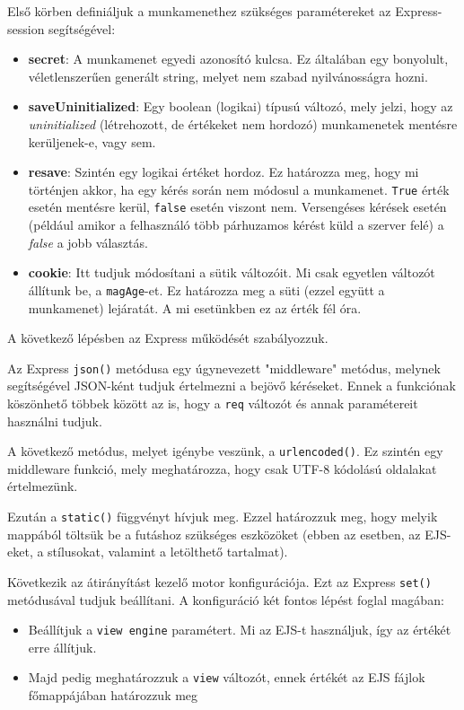 Első körben definiáljuk a munkamenethez szükséges paramétereket az Express-session segítségével:
\begin{itemize}
\item{\textbf{secret}: A munkamenet egyedi azonosító kulcsa. Ez általában egy bonyolult, véletlenszerűen generált string, melyet nem szabad nyilvánosságra hozni.}
\item{\textbf{saveUninitialized}: Egy boolean (logikai) típusú változó, mely jelzi, hogy az \textit{uninitialized} (létrehozott, de értékeket nem hordozó) munkamenetek mentésre kerüljenek-e, vagy sem.}
\item{\textbf{resave}: Szintén egy logikai értéket hordoz. Ez határozza meg, hogy mi történjen akkor, ha egy kérés során nem módosul a munkamenet. \texttt{True} érték esetén mentésre kerül, \texttt{false} esetén viszont nem. Versengéses kérések esetén (például amikor a felhasználó több párhuzamos kérést küld a szerver felé) a \textit{false} a jobb választás.}
\item{\textbf{cookie}: Itt tudjuk módosítani a sütik változóit. Mi csak egyetlen változót állítunk be, a \texttt{magAge}-et. Ez határozza meg a süti (ezzel együtt a munkamenet) lejáratát. A mi esetünkben ez az érték fél óra.}
\end{itemize}

\noindent
A következő lépésben az Express működését szabályozzuk.

Az Express \texttt{json()} metódusa egy úgynevezett "middleware" metódus, melynek segítségével JSON-ként tudjuk értelmezni a bejövő kéréseket. Ennek a funkciónak köszönhető többek között az is, hogy a \texttt{req} változót és annak paramétereit használni tudjuk.

A következő metódus, melyet igénybe veszünk, a \texttt{urlencoded()}. Ez szintén egy middleware funkció, mely meghatározza, hogy csak UTF-8 kódolású oldalakat értelmezünk.

Ezután a \texttt{static()} függvényt hívjuk meg. Ezzel határozzuk meg, hogy melyik mappából töltsük be a futáshoz szükséges eszközöket (ebben az esetben, az EJS-eket, a stílusokat, valamint a letölthető tartalmat).

Következik az átirányítást kezelő motor konfigurációja. Ezt az Express \texttt{set()} metódusával tudjuk beállítani. A konfiguráció két fontos lépést foglal magában:
\begin{itemize}
\item{Beállítjuk a \texttt{view engine} paramétert. Mi az EJS-t használjuk, így az értékét erre állítjuk.}
\item{Majd pedig meghatározzuk a \texttt{view} változót, ennek értékét az EJS fájlok főmappájában határozzuk meg}
\end{itemize}

